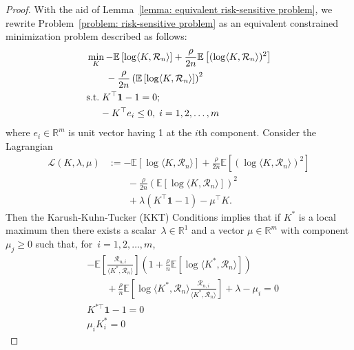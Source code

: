 \begin{proof}
  With the aid of Lemma~\ref{lemma: equivalent risk-sensitive problem},  we rewrite Problem~\eqref{problem: risk-sensitive problem} as an equivalent constrained minimization problem described as follows:
    \begin{align*}
        &\min_{K} -\mathbb{E}\left[ \log \langle K, \mathcal{R}_n \rangle \right] + \frac{\rho}{2n} \mathbb{E}\left[ (\log \langle K, \mathcal{R}_n \rangle )^2 \right] \\
        &\qquad   -\frac{\rho}{2n}\left( \mathbb{E}\left[ \log \langle K, \mathcal{R}_n \rangle \right]\right)^2 \\
        &{\rm s. t.} \; K^\top  \mathbf{1} - 1 = 0; \\
        &\;\;\;\;\; -K^\top  e_i \leq 0, \; i=1,2, \ldots, m
    \end{align*}
    where $ e_i \in \mathbb{R}^m $ is unit vector having 1 at the $i$th component. Consider the Lagrangian
    \begin{align*}
        \mathcal{L}(K, \lambda, \mu)
        &:= -\mathbb{E}\left[ \log \langle K, \mathcal{R}_n \rangle \right] + \frac{\rho}{2n} \mathbb{E} \left[ ( \log \langle K, \mathcal{R}_n \rangle)^2 \right] \\
        &\qquad -\frac{\rho}{2n}\left( \mathbb{E}\left[ \log \langle K, \mathcal{R}_n \rangle \right] \right)^2 \\ & \qquad + \lambda (K^\top  \mathbf{1} - 1) - \mu^\top K.
    \end{align*}
Then the Karush-Kuhn-Tucker (KKT) Conditions implies that if $K^*$ is a local maximum then there exists a scalar~$\lambda \in \mathbb{R}^1$ and a vector $\mu \in \mathbb{R}^m$ with component $\mu_j \geq 0$ such that, for~$i=1,2, \ldots, m$,
    \begin{align}
        &-\mathbb{E}\left[ \frac{\mathcal{R}_{n,i}}{ \langle K^{*}, \mathcal{R}_n \rangle} \right] \left( 1 + \frac{\rho}{n}\mathbb{E}\left[ \log \langle K^{*}, \mathcal{R}_n \rangle \right] \right) \nonumber \\
        &\qquad + \frac{\rho}{n}\mathbb{E}\left[ \log \langle K^{*}, \mathcal{R}_n \rangle \frac{\mathcal{R}_{n,i}}{\langle K^{*}, \mathcal{R}_n \rangle }  \right] +\lambda - \mu_i = 0 \label{eq:partial Ki (risk)} \\
        & K^{*\top} \mathbf{1} - 1 = 0 \label{eq: partical lambda (risk)} \\
        & \mu_i K_i^* = 0 \label{eq: Mu_i x Ki* = 0 (risk)}
    \end{align}

\end{proof}
